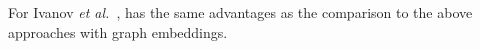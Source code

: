 For Ivanov {\em et al.}~\cite{ivanov21predicting}, {\tool} has
the same advantages as the comparison to the above approaches
with graph embeddings.





